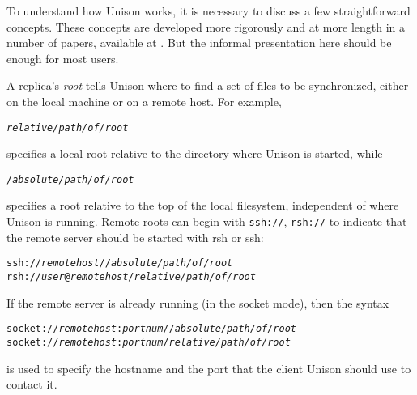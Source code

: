 \documentclass{article}
\newcommand{\NT}[1]{\textit{#1}}
\begin{document}

To understand how Unison works, it is necessary to discuss a few
straightforward concepts.
%
These concepts are developed more rigorously and at more length in a number
of papers, available at .
But the informal presentation here should be enough for most users.



A replica's {\em root} tells Unison where to find a set of files to be
synchronized, either on the local machine or on a remote host.
For example,
\begin{alltt}
      \NT{relative/path/of/root}
\end{alltt}
\noindent
specifies a local root relative to the directory where Unison is
started, while
\begin{alltt}
      /\NT{absolute/path/of/root}
\end{alltt}
\noindent
specifies a root relative to the top of the local filesystem,
independent of where Unison is running.  Remote roots can begin with
\verb|ssh://|,
\verb|rsh://|
to indicate that the remote server should be started with rsh or ssh:
\begin{alltt}
      ssh://\NT{remotehost}//\NT{absolute/path/of/root}
      rsh://\NT{user}@\NT{remotehost}/\NT{relative/path/of/root}
\end{alltt}
If the remote server is already running (in the socket mode), then the syntax
\begin{alltt}
      socket://\NT{remotehost}:\NT{portnum}//\NT{absolute/path/of/root}
      socket://\NT{remotehost}:\NT{portnum}/\NT{relative/path/of/root}
\end{alltt}
\noindent
is used to specify the hostname and the port that the client Unison should
use to contact it.
\end{document}
